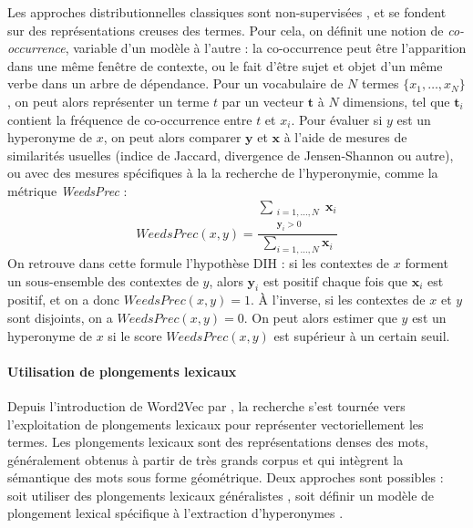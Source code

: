 Les approches distributionnelles classiques sont non-supervisées \cite{weeds-etal-2004-characterising}, et se fondent sur des représentations creuses des termes. Pour cela, on définit une notion de \textit{co-occurrence}, variable d'un modèle à l'autre : la co-occurrence peut être l'apparition dans une même fenêtre de contexte, ou le fait d'être sujet et objet d'un même verbe dans un arbre de dépendance. Pour un vocabulaire de $N$ termes $\{x_1, \ldots, x_N\}$, on peut alors représenter un terme $t$ par un vecteur $\textbf{t}$ à $N$ dimensions, tel que $\textbf{t}_i$ contient la fréquence de co-occurrence entre $t$ et $x_i$. Pour évaluer si $y$ est un hyperonyme de $x$, on peut alors comparer $\textbf{y}$ et $\textbf{x}$ à l'aide de mesures de similarités usuelles (indice de Jaccard, divergence de Jensen-Shannon ou autre), ou avec des mesures spécifiques à la la recherche de l'hyperonymie, comme la métrique \textit{WeedsPrec} \cite{weeds-etal-2004-characterising} :
\begin{equation}
    WeedsPrec(x, y) = \frac{\displaystyle \sum_{\substack{i=1, \ldots, N \\ \textbf{y}_i > 0}} \textbf{x}_i}{\displaystyle \sum_{i =1, \ldots, N } \textbf{x}_i}
\end{equation}
On retrouve dans cette formule l'hypothèse DIH : si les contextes de $x$ forment un sous-ensemble des contextes de $y$, alors $\textbf{y}_i$ est positif chaque fois que $\textbf{x}_i$ est positif, et on a donc $WeedsPrec(x, y) = 1$. À l'inverse, si les contextes de $x$ et $y$ sont disjoints, on a $WeedsPrec(x, y) = 0$. On peut alors estimer que $y$ est un hyperonyme de $x$ si le score $WeedsPrec(x, y)$ est supérieur à un certain seuil.

\paragraph{Utilisation de plongements lexicaux}

Depuis l'introduction de Word2Vec par \cite{mikolov2013distributed}, la recherche s'est tournée vers l'exploitation de plongements lexicaux pour représenter vectoriellement les termes. Les plongements lexicaux sont des représentations denses des mots, généralement obtenus à partir de très grands corpus et qui intègrent la sémantique des mots sous forme géométrique.
Deux approches sont possibles : soit utiliser des plongements lexicaux généralistes \cite{fu2014learning, gupta2016domain, atzori2020fully, pocostales-2016-nuig}, soit définir un modèle de plongement lexical spécifique à l'extraction d'hyperonymes \cite{nguyen-etal-2017-hierarchical, nickel2017poincare, nickel2018learning, yu2015learning, luu-etal-2016-learning, vendrov2015order}. 

